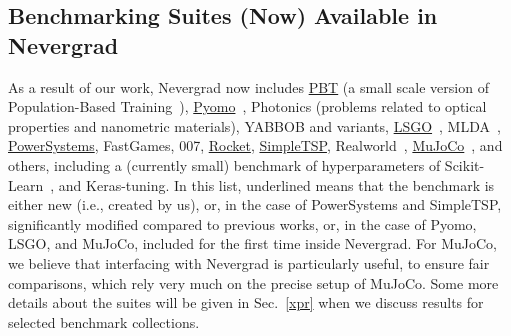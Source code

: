 \subsection{Benchmarking Suites (Now) Available in Nevergrad} 
As a result of our work, Nevergrad now includes \underline{PBT} (a small scale version of Population-Based Training~\cite{pbt}), \underline{Pyomo}~\cite{pyomo}, Photonics (problems related to optical properties and nanometric materials), YABBOB and variants, \underline{LSGO}~\cite{lsgo}, MLDA~\cite{mlda}, \underline{PowerSystems}, FastGames, 007, \underline{Rocket}, \underline{SimpleTSP}, Realworld~\cite{nevergrad,versatile}, \underline{MuJoCo}~\cite{mujoco}, and others, including a (currently small) benchmark of hyperparameters of Scikit-Learn~\cite{sklearn}, and Keras-tuning. In this list, underlined means that the benchmark is either new (i.e., created by us), or, in the case of PowerSystems and SimpleTSP, significantly modified compared to previous works, or, in the case of Pyomo, LSGO, and MuJoCo, included for the first time inside Nevergrad. For MuJoCo, we believe that interfacing with Nevergrad is particularly useful, to ensure fair comparisons, which rely very much on the precise setup of MuJoCo. 
{Some more details about the suites will be given in Sec.~\ref{xpr} when  we discuss results for selected benchmark collections.} 






